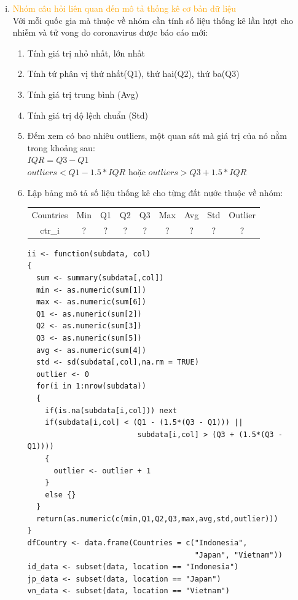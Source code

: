 \documentclass[a4paper]{article}
\theoremstyle{definition}
\begin{document}
\begin{enumerate}[i)]
\item \textcolor{orange}{Nhóm câu hỏi liên quan đến mô tả thống kê cơ bản dữ liệu}\\
Với mỗi quốc gia mà thuộc về nhóm cần tính số liệu thống kê lần lượt cho nhiễm và tử vong do coronavirus được báo cáo mới:
\begin{enumerate}[1)]

    \item Tính giá trị nhỏ nhất, lớn nhất
    
    \item Tính tứ phân vị thứ nhất(Q1), thứ hai(Q2), thứ ba(Q3) 
    
    \item Tính giá trị trung bình (Avg)
    
    \item Tính giá trị độ lệch chuẩn (Std)
    
    \item Đếm xem có bao nhiêu outliers, một quan sát mà giá trị của nó nằm trong khoảng sau:\\
    $IQR = Q3 - Q1$\\
    $outliers < Q1 - 1.5*IQR$ hoặc $outliers > Q3 + 1.5*IQR$
    
    \item Lập bảng mô tả số liệu thống kê cho từng đất nước thuộc về nhóm: \\
\begin{center}
      \begin{tabular}{ c c c c c c c c c}
        Countries & Min & Q1 & Q2 & Q3 & Max & Avg & Std & Outlier \\ 
        ctr\_i & ? & ? & ? & ? & ? & ? & ? & ? \\ 
      \end{tabular}
    \end{center}
    \begin{lstlisting}[frame=single]
ii <- function(subdata, col)
{
  sum <- summary(subdata[,col])
  min <- as.numeric(sum[1])
  max <- as.numeric(sum[6])
  Q1 <- as.numeric(sum[2])
  Q2 <- as.numeric(sum[3])
  Q3 <- as.numeric(sum[5])
  avg <- as.numeric(sum[4])
  std <- sd(subdata[,col],na.rm = TRUE)
  outlier <- 0
  for(i in 1:nrow(subdata))
  {
    if(is.na(subdata[i,col])) next
    if(subdata[i,col] < (Q1 - (1.5*(Q3 - Q1))) || 
                         subdata[i,col] > (Q3 + (1.5*(Q3 - Q1))))
    {
      outlier <- outlier + 1
    }
    else {}
  }
  return(as.numeric(c(min,Q1,Q2,Q3,max,avg,std,outlier)))
}
dfCountry <- data.frame(Countries = c("Indonesia", 
                                      "Japan", "Vietnam"))
id_data <- subset(data, location == "Indonesia")
jp_data <- subset(data, location == "Japan")
vn_data <- subset(data, location == "Vietnam")


\end{lstlisting}
\end{enumerate}
\end{enumerate}
\end{document}
